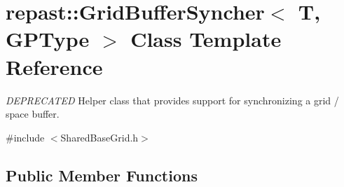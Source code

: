 \hypertarget{classrepast_1_1_grid_buffer_syncher}{\section{repast\-:\-:Grid\-Buffer\-Syncher$<$ T, G\-P\-Type $>$ Class Template Reference}
\label{classrepast_1_1_grid_buffer_syncher}
}


{\itshape D\-E\-P\-R\-E\-C\-A\-T\-E\-D} Helper class that provides support for synchronizing a grid / space buffer.  




{\ttfamily \#include $<$Shared\-Base\-Grid.\-h$>$}

\subsection*{Public Member Functions}
